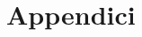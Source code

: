 \documentclass{tufte-book} %
\theoremstyle{definition}
\theoremstyle{theorem}
\theoremstyle{plain}
\theoremstyle{remark}
\theoremstyle{remark}
\begin{document}
  
\chapter{Appendici}\label{ch:appendice}

 












\end{document}
